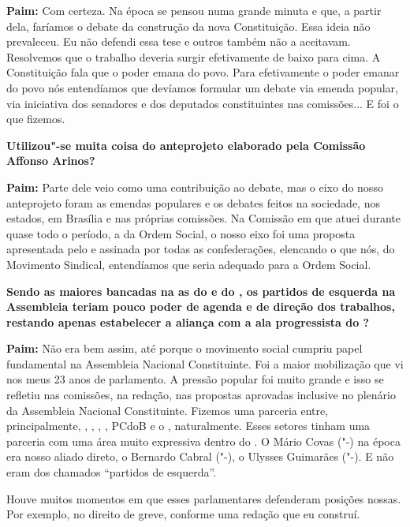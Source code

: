 \textbf{Paim:} Com certeza. Na época se pensou numa grande minuta e que,
a partir dela, faríamos o debate da construção da nova Constituição.
Essa ideia não prevaleceu. Eu não defendi essa tese e outros também não
a aceitavam. Resolvemos que o trabalho deveria surgir efetivamente de
baixo para cima. A Constituição fala que o poder emana do povo. Para
efetivamente o poder emanar do povo nós entendíamos que devíamos
formular um debate via emenda popular, via iniciativa dos senadores e
dos deputados constituintes nas comissões... E foi o que fizemos.

\textbf{Utilizou"-se muita coisa do anteprojeto elaborado pela Comissão
Affonso Arinos?}

\textbf{Paim:} Parte dele veio como uma contribuição ao debate, mas o
eixo do nosso anteprojeto foram as emendas populares e os debates feitos
na sociedade, nos estados, em Brasília e nas próprias comissões. Na
Comissão em que atuei durante quase todo o período, a da Ordem Social, o
nosso eixo foi uma proposta apresentada pelo  e assinada por todas
as confederações, elencando o que nós, do Movimento Sindical,
entendíamos que seria adequado para a Ordem Social.

\textbf{Sendo as maiores bancadas na  as do  e do , os
partidos de esquerda na Assembleia teriam pouco poder de agenda e de
direção dos trabalhos, restando apenas estabelecer a aliança com a ala
progressista do ? }

\textbf{Paim:} Não era bem assim, até porque o movimento social cumpriu
papel fundamental na Assembleia Nacional Constituinte. Foi a maior
mobilização que vi nos meus 23 anos de parlamento. A pressão popular foi
muito grande e isso se refletiu nas comissões, na redação, nas propostas
aprovadas inclusive no plenário da Assembleia Nacional Constituinte.
Fizemos uma parceria entre, principalmente, , , , , PCdoB e
o , naturalmente. Esses setores tinham uma parceria com uma área muito
expressiva dentro do . O Mário Covas ("-) na época era nosso
aliado direto, o Bernardo Cabral ("-), o Ulysses Guimarães
("-). E não eram dos chamados ``partidos de esquerda''.

Houve muitos momentos em que esses parlamentares defenderam posições
nossas. Por exemplo, no direito de greve, conforme uma redação que eu
construí.

